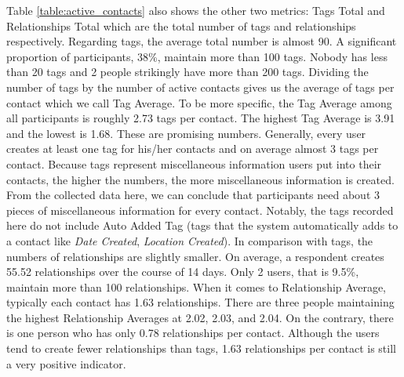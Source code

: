 Table \ref{table:active_contacts} also shows the other two metrics: Tags Total and Relationships Total which are the total number of tags and relationships respectively. Regarding tags, the average total number is almost 90. A significant proportion of participants, 38\%, maintain more than 100 tags. Nobody has less than 20 tags and 2 people strikingly have more than 200 tags. Dividing the number of tags by the number of active contacts gives us the average of tags per contact which we call Tag Average. To be more specific, the Tag Average among all participants is roughly 2.73 tags per contact. The highest Tag Average is 3.91 and the lowest is 1.68. These are promising numbers. Generally, every user creates at least one tag for his/her contacts and on average almost 3 tags per contact. Because tags represent miscellaneous information users put into their contacts, the higher the numbers, the more miscellaneous information is created. From the collected data here, we can conclude that participants need about 3 pieces of miscellaneous information for every contact. Notably, the tags recorded here do not include Auto Added Tag (tags that the system automatically adds to a contact like \textit{Date Created}, \textit{Location Created}). In comparison with tags, the numbers of relationships are slightly smaller. On average, a respondent creates 55.52 relationships over the course of 14 days. Only 2 users, that is 9.5\%, maintain more than 100 relationships. When it comes to Relationship Average, typically each contact has 1.63 relationships. There are three people maintaining the highest Relationship Averages at 2.02, 2.03, and 2.04. On the contrary, there is one person who has only 0.78 relationships per contact. Although the users tend to create fewer relationships than tags, 1.63 relationships per contact is still a very positive indicator.


